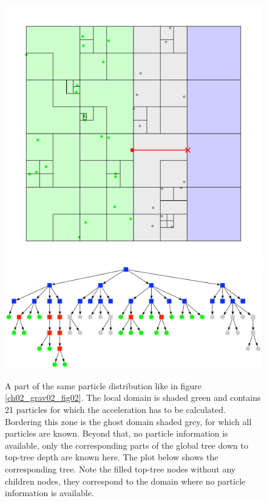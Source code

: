 \begin{figure}[htbp]
\begin{center}
\includegraphics[scale=0.6]{07quadtree50_xy_TPL2.pdf}
\includegraphics[scale=0.3]{07quadtree50_TPL2_stage3.pdf}
\caption{A part of the same particle distribution like in figure \ref{ch02_grav02_fig02}. The local domain is shaded green and contains 21 particles for which the acceleration has to be calculated. Bordering this zone is the ghost domain shaded grey, for which all particles are known. Beyond that, no particle information is available, only the corresponding parts of the global tree down to top-tree depth are known here. The plot below shows the corresponding tree. Note the filled top-tree nodes without any children nodes, they correspond to the domain where no particle information is available.}
\label{ch02_grav02_fig12}
\end{center}
\end{figure}


